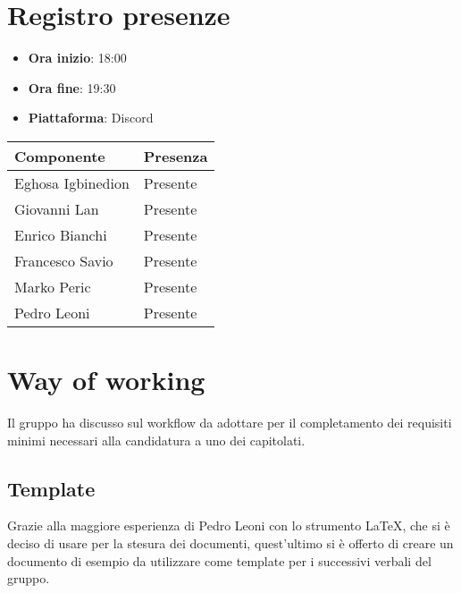 \documentclass[a4paper, 12pt]{article}
\begin{document}
\section{Registro presenze}
   \begin{itemize}
        \item[] \textbf{Ora inizio}: 18:00
        \item[] \textbf{Ora fine}: 19:30
        \item[] \textbf{Piattaforma}: Discord	
    \end{itemize}
\begin{table}[!h]
    \centering
    {\renewcommand{\arraystretch}{2}
    \begin{tabularx}{\textwidth}{| X | X |}
        \hline
            \textbf{\large Componente} & 
            \textbf{\large Presenza} \\ 
        \hline 
            Eghosa Igbinedion &
            Presente \\ 
        \hline 
            Giovanni Lan &
            Presente \\ 
        \hline 
            Enrico Bianchi &
            Presente \\ 
        \hline 
            Francesco Savio &
            Presente \\ 
        \hline 
            Marko Peric &
            Presente \\ 
        \hline 
            Pedro Leoni &
            Presente \\ 
        \hline 
    \end{tabularx}}
\end{table}

\newpage

\section{Way of working}
Il gruppo ha discusso sul workflow da adottare per il completamento dei requisiti minimi necessari alla candidatura a uno dei capitolati.

\subsection{Template}
Grazie alla maggiore esperienza di Pedro Leoni con lo strumento LaTeX, che si è deciso di usare per la stesura dei documenti, quest'ultimo si è offerto di creare un documento di esempio da utilizzare come template per i successivi verbali del gruppo.
\end{document}
